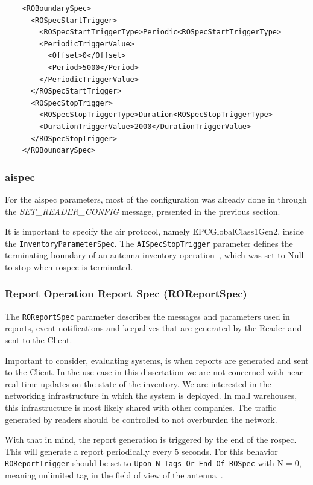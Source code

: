 \begin{listing}
    \begin{verbatim}
    <ROBoundarySpec>
      <ROSpecStartTrigger>
        <ROSpecStartTriggerType>Periodic<ROSpecStartTriggerType>
        <PeriodicTriggerValue>
          <Offset>0</Offset>
          <Period>5000</Period>
        </PeriodicTriggerValue>
      </ROSpecStartTrigger>
      <ROSpecStopTrigger>
        <ROSpecStopTriggerType>Duration<ROSpecStopTriggerType>
        <DurationTriggerValue>2000</DurationTriggerValue>
      </ROSpecStopTrigger>
    </ROBoundarySpec>
    \end{verbatim}
    \caption{}
    \label{code:boudaryspec}
\end{listing}

\subsubsection{\acl{aispec}}

For the \ac{aispec} parameters, most of the configuration was already done in through the \textit{SET\_READER\_CONFIG} message, presented in the previous section.

It is important to specify the air protocol, namely EPCGlobalClass1Gen2, inside the \texttt{InventoryParameterSpec}.
The \texttt{AISpecStopTrigger} parameter defines the terminating boundary of an antenna inventory operation~\cite{LowLevelReader}, which was set to Null to stop when \ac{rospec} is terminated.

\subsubsection{Report Operation Report Spec (ROReportSpec)}

The \texttt{ROReportSpec} parameter describes the messages and parameters used in reports, event notifications and keepalives that are generated by the Reader and sent to the Client.

Important to consider, evaluating systems, is when reports are generated and sent to the Client. 
In the use case in this dissertation we are not concerned with near real-time updates on the state of the inventory. We are interested in the networking infrastructure in which the system is deployed. In mall warehouses, this infrastructure is most likely shared with other companies. The traffic generated by readers should be controlled to not overburden the network.

With that in mind, the report generation is triggered by the end of the \ac{rospec}. This will generate a report periodically every $5$ seconds.
For this behavior \texttt{ROReportTrigger} should be set to \texttt{Upon\_N\_Tags\_Or\_End\_Of\_ROSpec} with N$=0$, meaning unlimited tag in the field of view of the antenna~\cite{LowLevelReader}.

